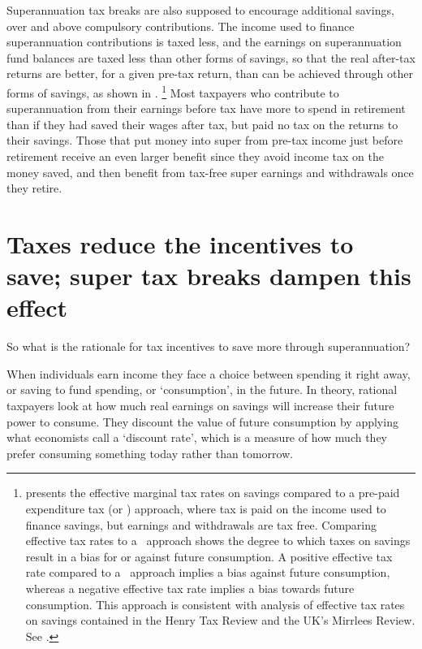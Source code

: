 Superannuation tax breaks are also supposed to encourage additional savings, over and above compulsory contributions. The income used to finance superannuation contributions is taxed less, and the earnings on superannuation fund balances are taxed less than other forms of savings, so that the real after-tax returns are better, for a given pre-tax return, than can be achieved through other forms of savings, as shown in .%
%
\footnote{%
 presents the effective marginal tax rates on savings compared to a pre-paid expenditure tax (or \TEE) approach, where tax is paid on the income used to finance savings, but earnings and withdrawals are tax free. Comparing effective tax rates to a \TEE\ approach shows the degree to which taxes on savings result in a bias for or against future consumption. A positive effective tax rate compared to a \TEE\ approach implies a bias against future consumption, whereas a negative effective tax rate implies a bias towards future consumption. This approach is consistent with analysis of effective tax rates on savings contained in the Henry Tax Review and the UK’s Mirrlees Review. 
See \textcites{HenryTaxReview2010}{Wakefield2009}[][322]{MirrleesAdamBesleyEtAl2011}.%
}
%  
Most taxpayers who contribute to superannuation from their earnings before tax have more to spend in retirement than if they had saved their wages after tax, but paid no tax on the returns to their savings. Those that put money into super from pre-tax income just before retirement receive an even larger benefit since they avoid income tax on the money saved, and then benefit from tax-free super earnings and withdrawals once they retire.

\section{Taxes reduce the incentives to save; super tax breaks dampen this effect}\label{sec:SUPER-2-5}
So what is the rationale for tax incentives to save more through superannuation?

When individuals earn income they face a choice between spending it right away, or saving to fund spending, or ‘consumption’, in the future. In theory, rational taxpayers look at how much real earnings on savings will increase their future power to consume. They discount the value of future consumption by applying what economists call a ‘discount rate’, which is a measure of how much they prefer consuming something today rather than tomorrow. 

